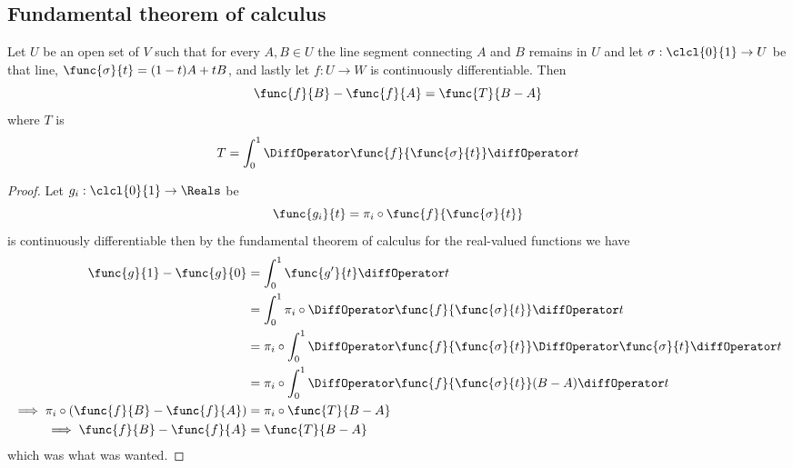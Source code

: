 \subsection{Fundamental theorem of calculus}
\begin{theorem}
    Let \(U\) be an open set of \(V\) such that for every \(A,B \in U\) the line segment connecting \(A\) and \(B\) remains in \(U\) and let \(\sigma : \clcl{0}{1}\to U\) be that line, \(\func{\sigma}{t} = (1-t)A + tB\), and lastly let \(f: U \to W\) is continuously differentiable. Then
    \begin{equation*}
        \func{f}{B} - \func{f}{A} = \func{T}{B - A}
    \end{equation*}
    where \(T\) is
    \begin{equation*}
        T = \int_{0}^{1} \DiffOperator \func{f}{ \func{\sigma}{t}} \diffOperator t
    \end{equation*}
\end{theorem}

\begin{proof}
    Let \(g_i : \clcl{0}{1} \to \Reals\) be
    \begin{equation*}
        \func{g_i}{t} = \pi_i \circ \func{f}{\func{\sigma}{t}}
    \end{equation*}
    is continuously differentiable then by the fundamental theorem of calculus for the real-valued functions we have
    \begin{align*}
        \func{g}{1} - \func{g}{0}                                   & = \int_{0}^{1} \func{g'}{t} \diffOperator t                                                                        \\
                                                                    & = \int_{0}^{1} \pi_i \circ \DiffOperator \func{f}{\func{\sigma}{t}} \diffOperator t                                \\
                                                                    & = \pi_i \circ \int_{0}^{1} \DiffOperator \func{f}{\func{\sigma}{t}} \DiffOperator \func{\sigma}{t} \diffOperator t \\
                                                                    & = \pi_i \circ \int_{0}^{1} \DiffOperator \func{f}{\func{\sigma}{t}} (B - A) \diffOperator t                        \\
        \implies \pi_i \circ \left(\func{f}{B} - \func{f}{A}\right) & = \pi_i \circ \func{T}{B- A}                                                                                       \\
        \implies \func{f}{B} - \func{f}{A}                          & =\func{T}{B- A}
    \end{align*}
    which was what was wanted.
\end{proof}

